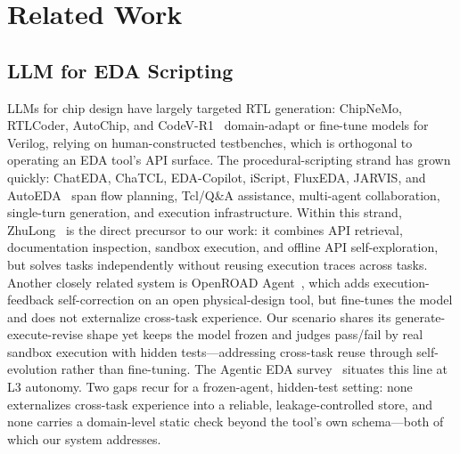 \section{Related Work}
\label{sec:related_work}

\subsection{LLM for EDA Scripting}
\label{sec:rw_eda}

LLMs for chip design have largely targeted RTL generation: ChipNeMo, RTLCoder, AutoChip, and CodeV-R1~\cite{liu2023chipnemo,liu2024rtlcoder,thakur2023autochip,zhu2026qimeng} domain-adapt or fine-tune models for Verilog, relying on human-constructed testbenches, which is orthogonal to operating an EDA tool's API surface. The procedural-scripting strand has grown quickly: ChatEDA, ChaTCL, EDA-Copilot, iScript, FluxEDA, JARVIS, and AutoEDA~\cite{wu2024chateda,rui2025chatcl,xiao2025eda,xu2026iscript,chen2026fluxeda,lu2025autoeda,zhang2025jarvis} span flow planning, Tcl/Q\&A assistance, multi-agent collaboration, single-turn generation, and execution infrastructure. Within this strand, ZhuLong~\cite{liu2026zhulong} is the direct precursor to our work: it combines API retrieval, documentation inspection, sandbox execution, and offline API self-exploration, but solves tasks independently without reusing execution traces across tasks. Another closely related system is OpenROAD Agent~\cite{wu2025openroad}, which adds execution-feedback self-correction on an open physical-design tool, but fine-tunes the model and does not externalize cross-task experience. Our scenario shares its generate-execute-revise shape yet keeps the model frozen and judges pass/fail by real sandbox execution with hidden tests---addressing cross-task reuse through self-evolution rather than fine-tuning. The Agentic EDA survey~\cite{zang2025dawn} situates this line at L3 autonomy. Two gaps recur for a frozen-agent, hidden-test setting: none externalizes cross-task experience into a reliable, leakage-controlled store, and none carries a domain-level static check beyond the tool's own schema---both of which our system addresses.
